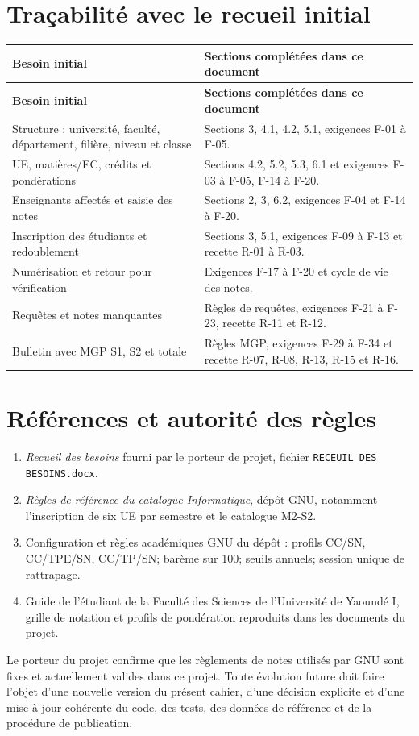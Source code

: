 \documentclass[11pt,a4paper]{article}
\begin{document}
\section{Traçabilité avec le recueil initial}

\begin{longtable}{L{4.0cm}L{11.3cm}}
\toprule
\textbf{Besoin initial} & \textbf{Sections complétées dans ce document} \\
\midrule
\endfirsthead
\toprule
\textbf{Besoin initial} & \textbf{Sections complétées dans ce document} \\
\midrule
\endhead
Structure : université, faculté, département, filière, niveau et classe & Sections 3, 4.1, 4.2, 5.1, exigences F-01 à F-05. \\
UE, matières/EC, crédits et pondérations & Sections 4.2, 5.2, 5.3, 6.1 et exigences F-03 à F-05, F-14 à F-20. \\
Enseignants affectés et saisie des notes & Sections 2, 3, 6.2, exigences F-04 et F-14 à F-20. \\
Inscription des étudiants et redoublement & Sections 3, 5.1, exigences F-09 à F-13 et recette R-01 à R-03. \\
Numérisation et retour pour vérification & Exigences F-17 à F-20 et cycle de vie des notes. \\
Requêtes et notes manquantes & Règles de requêtes, exigences F-21 à F-23, recette R-11 et R-12. \\
Bulletin avec MGP S1, S2 et totale & Règles MGP, exigences F-29 à F-34 et recette R-07, R-08, R-13, R-15 et R-16. \\
\bottomrule
\end{longtable}

\section{Références et autorité des règles}

\begin{enumerate}
  \item \textit{Recueil des besoins} fourni par le porteur de projet, fichier \texttt{RECEUIL DES BESOINS.docx}.
  \item \textit{Règles de référence du catalogue Informatique}, dépôt GNU, notamment l'inscription de six UE par semestre et le catalogue M2-S2.
  \item Configuration et règles académiques GNU du dépôt : profils CC/SN, CC/TPE/SN, CC/TP/SN; barème sur 100; seuils annuels; session unique de rattrapage.
  \item Guide de l'étudiant de la Faculté des Sciences de l'Université de Yaoundé I, grille de notation et profils de pondération reproduits dans les documents du projet.
\end{enumerate}

Le porteur du projet confirme que les règlements de notes utilisés par GNU sont fixes et actuellement valides dans ce projet. Toute évolution future doit faire l'objet d'une nouvelle version du présent cahier, d'une décision explicite et d'une mise à jour cohérente du code, des tests, des données de référence et de la procédure de publication.
\end{document}

